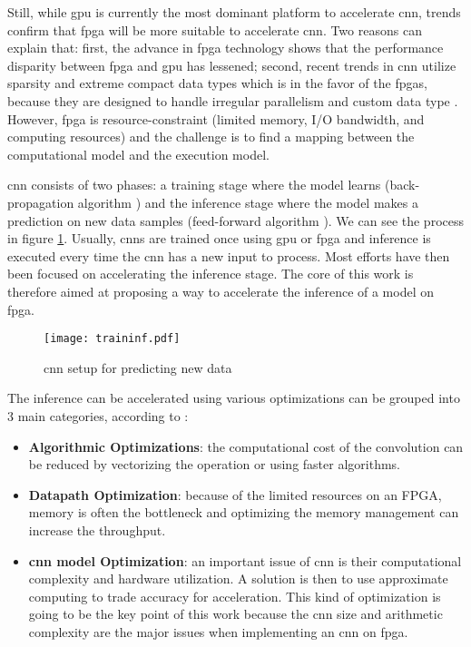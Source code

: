 Still, while \acrshort{gpu} is currently the most dominant platform to accelerate \acrshort{cnn}, trends confirm that \acrshort{fpga} will be more suitable to accelerate \acrshort{cnn}. Two reasons can explain that: first, the advance in \acrshort{fpga} technology shows that the performance disparity between \acrshort{fpga} and \acrshort{gpu} has lessened; second, recent trends in \acrshort{cnn} utilize sparsity and extreme compact data types which is in the favor of the \acrshort{fpga}s, because they are designed to handle irregular parallelism and custom data type \cite{nurvitadhi_can_2017}. However, \acrshort{fpga} is resource-constraint (limited memory, I/O bandwidth, and computing resources) and the challenge is to find a mapping between the computational model and the execution model.

\acrshort{cnn} consists of two phases: a training stage where the model learns (back-propagation algorithm \cite{lecun_backpropagation_1989}) and the inference stage where the model makes a prediction on new data samples (feed-forward algorithm \cite{zhang_optimizing_2015}). We can see the process in figure \ref{fig:traininf}. Usually, \acrshort{cnn}s are trained once using \acrshort{gpu} or \acrshort{fpga} and inference is executed every time the \acrshort{cnn} has a new input to process. Most efforts have then been focused on accelerating the inference stage. The core of this work is therefore aimed at proposing a way to accelerate the inference of a model on \acrshort{fpga}.
%
\begin{figure}
    \texttt{[image: traininf.pdf]}
    \caption{\acrshort{cnn} setup for predicting new data}
    \label{fig:traininf}
\end{figure}

The inference can be accelerated using various optimizations can be grouped into 3 main categories, according to \textcite{abdelouahab_accelerating_2018}:
\begin{itemize}
    \item \textbf{Algorithmic Optimizations}: the computational cost of the convolution can be reduced by vectorizing the operation or using faster algorithms.
    \item \textbf{Datapath Optimization}: because of the limited resources on an FPGA, memory is often the bottleneck and optimizing the memory management can increase the throughput.
    \item \textbf{\acrshort{cnn} model Optimization}: an important issue of \acrshort{cnn} is their computational complexity and hardware utilization. A solution is then to use approximate computing to trade accuracy for acceleration. This kind of optimization is going to be the key point of this work because the \acrshort{cnn} size and arithmetic complexity are the major issues when implementing an \acrshort{cnn} on \acrshort{fpga}.
\end{itemize}

